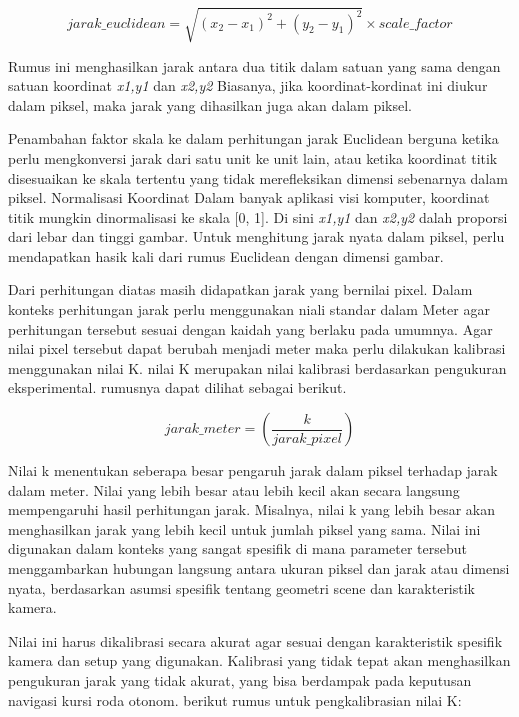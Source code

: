 \begin{equation}
    {jarak\_euclidean} = \sqrt{(x_2 - x_1)^2 + (y_2 - y_1)^2} \times scale\_factor
\end{equation}

Rumus ini menghasilkan jarak antara dua titik dalam satuan yang sama dengan satuan koordinat \emph{x1,y1} dan \emph{x2,y2} Biasanya, jika koordinat-kordinat ini diukur dalam piksel, maka jarak yang dihasilkan juga akan dalam piksel.

Penambahan faktor skala ke dalam perhitungan jarak Euclidean berguna ketika perlu mengkonversi jarak dari satu unit ke unit lain, atau ketika koordinat titik disesuaikan ke skala tertentu yang tidak merefleksikan dimensi sebenarnya dalam piksel. Normalisasi Koordinat Dalam banyak aplikasi visi komputer, koordinat titik mungkin dinormalisasi ke skala [0, 1]. Di sini \emph{x1,y1} dan \emph{x2,y2} dalah proporsi dari lebar dan tinggi gambar. Untuk menghitung jarak nyata dalam piksel, perlu mendapatkan hasik kali dari rumus Euclidean dengan dimensi gambar.

Dari perhitungan diatas masih didapatkan jarak yang bernilai pixel. Dalam konteks perhitungan jarak perlu menggunakan niali standar dalam Meter agar perhitungan tersebut sesuai dengan kaidah yang berlaku pada umumnya. Agar nilai pixel tersebut dapat berubah menjadi meter maka perlu dilakukan kalibrasi menggunakan nilai K. nilai K merupakan nilai kalibrasi berdasarkan pengukuran eksperimental. rumusnya dapat dilihat sebagai berikut. 

\begin{equation}
    jarak\_meter = \left(\frac{k}{{jarak\_pixel}}\right)
\end{equation}

Nilai k menentukan seberapa besar pengaruh jarak dalam piksel terhadap jarak dalam meter. Nilai yang lebih besar atau lebih kecil akan secara langsung mempengaruhi hasil perhitungan jarak. Misalnya, nilai k yang lebih besar akan menghasilkan jarak yang lebih kecil untuk jumlah piksel yang sama. Nilai ini digunakan dalam konteks yang sangat spesifik di mana parameter tersebut menggambarkan hubungan langsung antara ukuran piksel dan jarak atau dimensi nyata, berdasarkan asumsi spesifik tentang geometri scene dan karakteristik kamera.

Nilai ini harus dikalibrasi secara akurat agar sesuai dengan karakteristik spesifik kamera dan setup yang digunakan. Kalibrasi yang tidak tepat akan menghasilkan pengukuran jarak yang tidak akurat, yang bisa berdampak pada keputusan navigasi kursi roda otonom. berikut rumus untuk pengkalibrasian nilai K:

